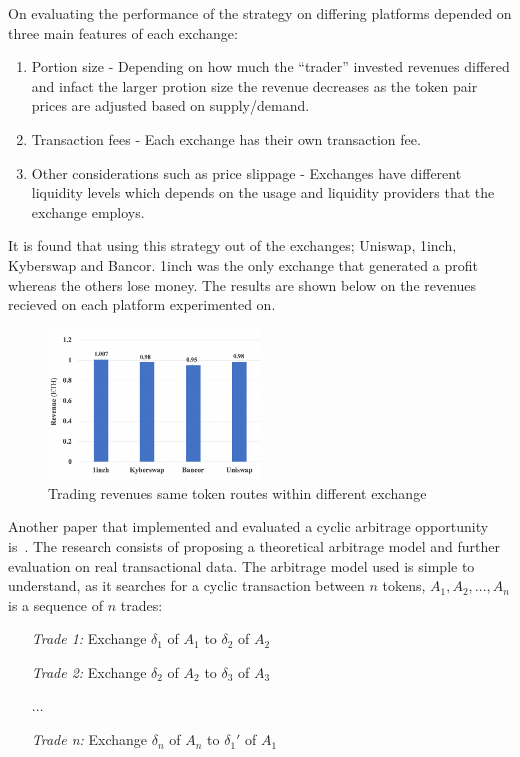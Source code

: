 On evaluating the performance of the strategy on differing platforms depended on three main features of each exchange:
\begin{enumerate}
    \item Portion size - Depending on how much the ``trader'' invested revenues differed and infact the larger protion size the revenue decreases as the token pair prices are adjusted based on supply/demand.
    \item Transaction fees - Each exchange has their own transaction fee.
    \item Other considerations such as price slippage - Exchanges have different liquidity levels which depends on the usage and liquidity providers that the exchange employs.
\end{enumerate}

It is found that using this strategy out of the exchanges; Uniswap, 1inch, Kyberswap and Bancor. 1inch was the only exchange that generated a profit whereas the others lose money. The results are shown below on the revenues recieved on each platform experimented on.

\begin{figure}[!htb]
    \centering
    \includegraphics[width=0.5\textwidth]{background/Images/DEXArb_results.png}
    \caption{Trading revenues same token routes within different exchange~\cite{boonpeam2021arbitrage}}
\end{figure}

Another paper that implemented and evaluated a cyclic arbitrage opportunity is~\cite{wang_cyclic_2022}. The research consists of proposing a theoretical arbitrage model and further evaluation on real transactional data. The arbitrage model used is simple to understand, as it searches for a cyclic transaction between $n$ tokens, $A_1, A_2, ..., A_n$ is a sequence of $n$ trades:
\begin{center}
    \begin{minipage}[c]{0.4\linewidth}
    \begin{itemize}
        \item[\textit{Trade 1:}] Exchange $\delta_1$ of $A_1$ to $\delta_2$ of $A_2$
        \item[\textit{Trade 2:}] Exchange $\delta_2$ of $A_2$ to $\delta_3$ of $A_3$
        \item[] $\dotsc$
        \item[\textit{Trade n:}] Exchange $\delta_n$ of $A_n$ to $\delta_1'$ of $A_1$
    \end{itemize}
    \end{minipage}
\end{center}

